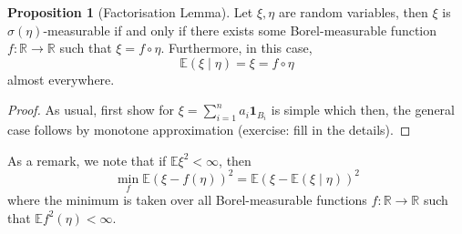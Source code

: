 \documentclass[]{article}
\theoremstyle{definition}
\theoremstyle{definition}
\newtheorem{proposition}{Proposition}[section]
\begin{document}
\begin{proposition}[Factorisation Lemma]
  Let \(\xi, \eta\) are random variables, then \(\xi\) is \(\sigma(\eta)\)-measurable 
  if and only if there exists some Borel-measurable function \(f : \mathbb{R} \to \mathbb{R}\) 
  such that \(\xi = f \circ \eta\). Furthermore, in this case, 
  \[\mathbb{E}(\xi \mid \eta) = \xi = f \circ \eta\]
  almost everywhere.
\end{proposition}
\begin{proof}
  As usual, first show for \(\xi = \sum_{i = 1}^n a_i \mathbf{1}_{B_i}\) is 
  simple which then, the general case follows by monotone approximation 
  (exercise: fill in the details).
\end{proof}

As a remark, we note that if \(\mathbb{E}\xi^2 < \infty\), then 
\[\min_f \mathbb{E}(\xi - f(\eta))^2 = \mathbb{E}(\xi - \mathbb{E}(\xi \mid \eta))^2\]
where the minimum is taken over all Borel-measurable functions 
\(f : \mathbb{R} \to \mathbb{R}\) such that \(\mathbb{E} f^2(\eta) < \infty\).
\end{document}
